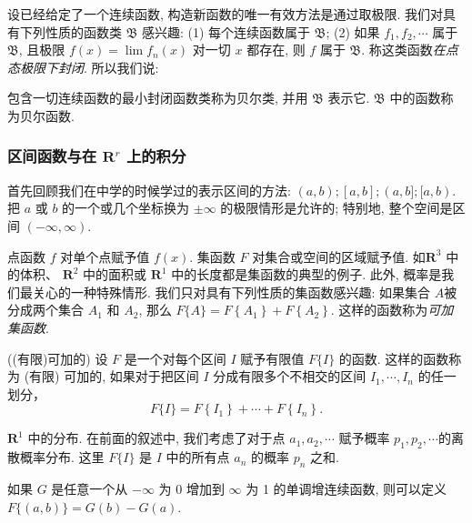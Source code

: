 设已经给定了一个连续函数, 构造新函数的唯一有效方法是通过取极限. 我们对具有下列性质的函数类 $\mathfrak{B}$ 感兴趣: (1) 每个连续函数属于 $\mathfrak{B}$; (2) 如果 $f_1, f_2, \cdots$ 属于 $\mathfrak{B}$, 且极限 $f(x)=\lim f_n(x)$ 对一切 $x$ 都存在, 则 $f$ 属于 $\mathfrak{B}$. 称这类函数\emph{在点态极限下封闭}. 所以我们说: 

\begin{definition*}
    包含一切连续函数的最小封闭函数类称为贝尔类, 并用 $\mathfrak{B}$ 表示它. $\mathfrak{B}$ 中的函数称为贝尔函数. 
\end{definition*}

\subsubsection*{区间函数与在 $\mathbf{R}^r$ 上的积分}

首先回顾我们在中学的时候学过的表示区间的方法: $(a,b); [a, b]; (a,b]; [a,b)$. 把 $a$ 或 $b$ 的一个或几个坐标换为 $\pm \infty$ 的极限情形是允许的; 特别地, 整个空间是区间 $(-\infty, \infty)$.

点函数 $f$ 对单个点赋予值 $f(x)$. 集函数 $F$ 对集合或空间的区域赋予值. 如$\mathbf{R}^3$ 中的体积、 $\mathbf{R}^2$ 中的面积或 $\mathbf{R}^1$ 中的长度都是集函数的典型的例子. 此外, 概率是我们最关心的一种特殊情形. 我们只对具有下列性质的集函数感兴趣: 如果集合 $A$被分成两个集合 $A_1$ 和 $A_2$, 那么 $F\{A\}=F\left\{A_1\right\}+F\left\{A_2\right\}$. 这样的函数称为\emph{可加集函数}.

\begin{definition*}((有限)可加的)
    设 $F$ 是一个对每个区间 $I$ 赋予有限值 $F\{I\}$ 的函数. 这样的函数称为 (有限) 可加的, 如果对于把区间 $I$ 分成有限多个不相交的区间 $I_1, \cdots, I_n$ 的任一划分，
$$
F\{I\}=F\left\{I_1\right\}+\cdots+F\left\{I_n\right\} .
$$
\end{definition*}

\begin{example}
    $\mathbf{R}^1$ 中的分布. 在前面的叙述中, 我们考虑了对于点 $a_1, a_2, \cdots$ 赋予概率 $p_1, p_2, \cdots$的离散概率分布. 这里 $F\{I\}$ 是 $I$ 中的所有点 $a_n$ 的概率 $p_n$ 之和.

    如果 $G$ 是任意一个从 $-\infty$ 为 0 增加到 $\infty$ 为 1 的单调增连续函数, 则可以定义 $F\{(a, b)\}=G(b)-G(a)$.
\end{example}


